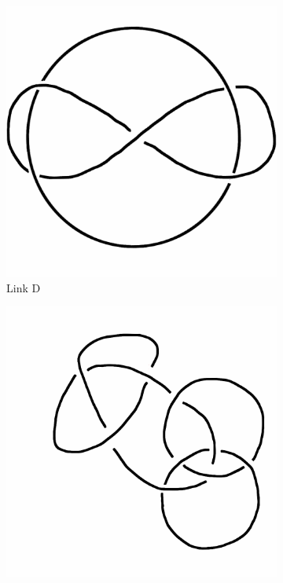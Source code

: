 \documentclass[12pt,letterpaper]{article}
\theoremstyle{definition}
\begin{document}
\begin{figure}[h]
    \begin{subfigure}{.3\textwidth}
        \centering
        \includegraphics[width=\textwidth]{meeting11pics/whitehead.png}
        \caption{Link D}
    \end{subfigure}
    \quad
    \begin{subfigure}{.3\textwidth}
        \centering
        \includegraphics[width=\textwidth]{meeting11pics/borromean-trefoil.png}

\end{subfigure}
\end{figure}
\end{document}
